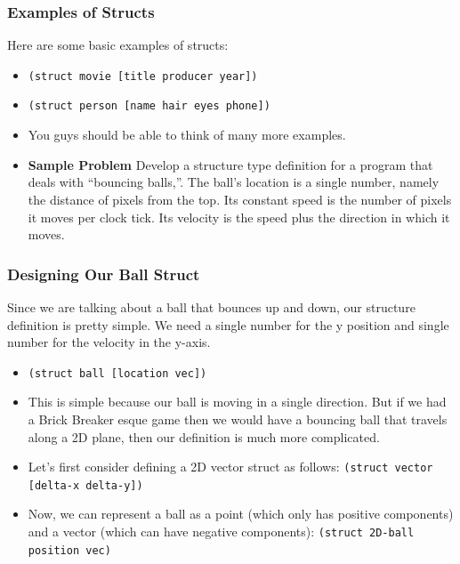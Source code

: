 \documentclass{beamer}
\begin{document}
\begin{frame}
  \frametitle{Examples of Structs}
  Here are some basic examples of structs:
  \begin{itemize}
  \item<2-> \texttt{(struct movie [title producer year])}
  \item<3-> \texttt{(struct person [name hair eyes phone])}
  \item<4-> You guys should be able to think of many more examples.
    \item<5-> \textbf{Sample Problem} Develop a structure type definition for a program that deals with “bouncing balls,”. The ball’s location is a single number, namely the distance of pixels from the top. Its constant speed is the number of pixels it moves per clock tick. Its velocity is the speed plus the direction in which it moves.
  \end{itemize}
  
  
\end{frame}

\begin{frame}
  \frametitle{Designing Our Ball Struct}
  Since we are talking about a ball that bounces up and down, our structure definition is pretty simple. We need a single number for the y position and single
  number for the velocity in the y-axis.
  \begin{itemize}
  \item<2-> \texttt{(struct ball [location vec])}
  \item<3-> This is simple because our ball is moving in a single direction. But if we had a Brick Breaker esque game then we would have a bouncing ball that
    travels along a 2D plane, then our definition is much more complicated.
  \item<4-> Let's first consider defining a 2D vector struct as follows: \texttt{(struct vector [delta-x delta-y])}
  \item<5-> Now, we can represent a ball as a point (which only has positive components) and a vector (which can have negative components):
    \texttt{(struct 2D-ball position vec)}
  \end{itemize}
\end{frame}

\end{document}
